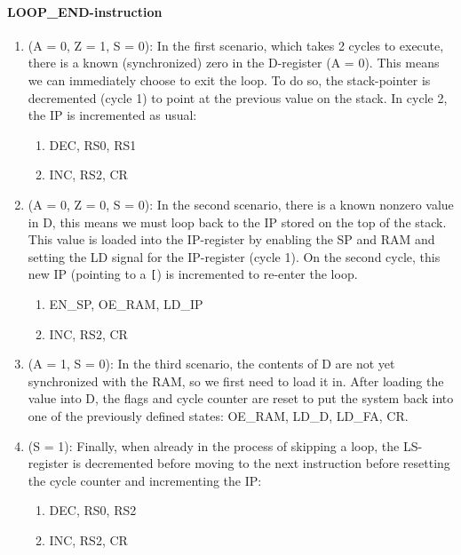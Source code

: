   \paragraph{LOOP\_END-instruction}
  \begin{enumerate}
  \item (A = 0, Z = 1, S = 0): In the first scenario, which takes 2 cycles to execute, there is a known (synchronized) zero in the D-register (A = 0). This means we can immediately choose to exit the loop. To do so, the stack-pointer is decremented (cycle 1) to point at the previous value on the stack. In cycle 2, the IP is incremented as usual:
    \begin{enumerate}
    \item DEC, RS0, RS1  
    \item INC, RS2, CR
    \end{enumerate}

  \item (A = 0, Z = 0, S = 0): In the second scenario, there is a known nonzero value in D, this means we must loop back to the IP stored on the top of the stack. This value is loaded into the IP-register by enabling the SP and RAM and setting the LD signal for the IP-register (cycle 1). On the second cycle, this new IP (pointing to a \texttt{[}) is incremented to re-enter the loop.
      \begin{enumerate}
      \item EN\_SP, OE\_RAM, LD\_IP
      \item INC, RS2, CR
      \end{enumerate}
      
    \item (A = 1, S = 0): In the third scenario, the contents of D are not yet synchronized with the RAM, so we first need to load it in. After loading the value into D, the flags and cycle counter are reset to put the system back into one of the previously defined states: OE\_RAM, LD\_D, LD\_FA, CR.

    \item (S = 1): Finally, when already in the process of skipping a loop, the LS-register is decremented before moving to the next instruction before resetting the cycle counter and incrementing the IP:
      \begin{enumerate}
      \item DEC, RS0, RS2
      \item INC, RS2, CR
      \end{enumerate}
  \end{enumerate}

